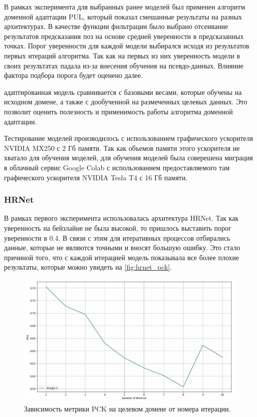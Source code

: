 В рамках эксперимента для выбранных ранее моделей был применен алгоритм доменной адаптации PUL, который показал смешанные результаты на разных архитектурах. В качестве функции фильтрации было выбрано отсеивание результатов предсказания поз на основе средней уверенности в предсказанных точках. Порог уверенности для каждой модели выбирался исходя из результатов первых итераций алгоритма. Так как на первых из них уверенность модели в своих результатах падала из-за внесения обучения на псевдо-данных. Влияние фактора подбора порога будет оценено далее.

 адаптированная модель сравнивается с базовыми весами, которые обучены на исходном домене, а также с дообученной на размеченных целевых данных. Это позволит оценить полезность и применимость работы алгоритма доменной адаптации.

Тестирование моделей производилось с использованием графического ускорителя NVIDIA MX250 с 2 Гб памяти. Так как объемов памяти этого ускорителя не хватало для обучения моделей, для обучения моделей была соверешена миграция в облачный сервис Google Colab с использованием предоставляемого там графического ускорителя NVIDIA Tesla T4 с 16 Гб памяти.

\subsubsection*{HRNet}

В рамках первого эксперимента использовалась архитектура HRNet. Так как уверенность на бейзлайне не была высокой, то пришлось выставить порог уверенности в 0.4. В связи с этим для итеративных процессов отбирались данные, которые не являются точными и вносят большую ошибку. Это стало причиной того, что с каждой итерацией модель показывала все более плохие результаты, которые можно увидеть на \autoref{fig:hrnet_pck}.

\begin{figure}[h]
	\centering
	\includegraphics[width=.9\textwidth]{./images/results/hrnet/hrnet_pck}
	\caption{Зависимость метрики PCK на целевом домене от номера итерации.}
	\label{fig:hrnet_pck}
\end{figure}

